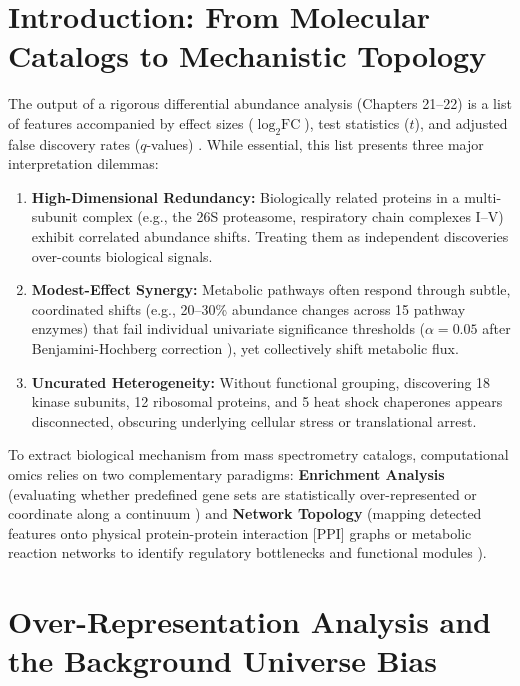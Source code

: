\documentclass[11pt,oneside]{book}
\begin{document}
\section{Introduction: From Molecular Catalogs to Mechanistic Topology}

The output of a rigorous differential abundance analysis (Chapters 21--22) is a list of features accompanied by effect sizes ($\log_2 \text{FC}$), test statistics ($t$), and adjusted false discovery rates ($q$-values) \cite{smyth2004linear, ritchie2015limma}. While essential, this list presents three major interpretation dilemmas:
\begin{enumerate}
    \item \textbf{High-Dimensional Redundancy:} Biologically related proteins in a multi-subunit complex (e.g., the 26S proteasome, respiratory chain complexes I--V) exhibit correlated abundance shifts. Treating them as independent discoveries over-counts biological signals.
    \item \textbf{Modest-Effect Synergy:} Metabolic pathways often respond through subtle, coordinated shifts (e.g., 20--30\% abundance changes across 15 pathway enzymes) that fail individual univariate significance thresholds ($\alpha = 0.05$ after Benjamini-Hochberg correction \cite{benjamini1995controlling}), yet collectively shift metabolic flux.
    \item \textbf{Uncurated Heterogeneity:} Without functional grouping, discovering 18 kinase subunits, 12 ribosomal proteins, and 5 heat shock chaperones appears disconnected, obscuring underlying cellular stress or translational arrest.
\end{enumerate}

To extract biological mechanism from mass spectrometry catalogs, computational omics relies on two complementary paradigms: \textbf{Enrichment Analysis} (evaluating whether predefined gene sets are statistically over-represented or coordinate along a continuum \cite{subramanian2005gene, liberzon2015molecular}) and \textbf{Network Topology} (mapping detected features onto physical protein-protein interaction [PPI] graphs or metabolic reaction networks to identify regulatory bottlenecks and functional modules \cite{barabasi2004network, szklarczyk2021string}).

\section{Over-Representation Analysis and the Background Universe Bias}
\end{document}
